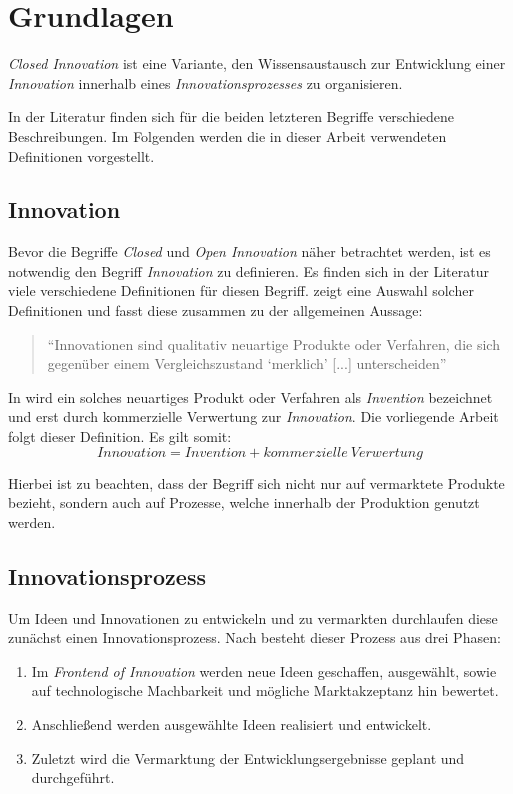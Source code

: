 \section{Grundlagen}\label{sec:grundlagen}
\textit{Closed Innovation} ist eine Variante, den Wissensaustausch
zur Entwicklung einer \textit{Innovation}
innerhalb eines \textit{Innovationsprozesses} zu organisieren.

In der Literatur finden sich für die beiden letzteren Begriffe verschiedene Beschreibungen.
Im Folgenden werden die in dieser Arbeit verwendeten Definitionen vorgestellt.

\subsection{Innovation}\label{sec:grundlagen-inno}
Bevor die Begriffe \textit{Closed} und \textit{Open Innovation} näher betrachtet werden,
ist es notwendig den Begriff \textit{Innovation} zu definieren.
Es finden sich in der Literatur viele verschiedene Definitionen für diesen Begriff.
\cite[5]{hauschildt2016innovationsmanagement} zeigt eine Auswahl solcher Definitionen und fasst diese
zusammen zu der allgemeinen Aussage:
\begin{quote}
    \enquote{Innovationen sind qualitativ neuartige Produkte oder Verfahren,
    die sich gegenüber einem Vergleichszustand \enquote{merklich} [...] unterscheiden}
    \cite[4]{hauschildt2016innovationsmanagement}
\end{quote}

In \cite[9]{herzog2011} wird ein solches neuartiges Produkt oder Verfahren als \textit{Invention} bezeichnet und erst durch kommerzielle Verwertung zur \textit{Innovation}.
Die vorliegende Arbeit folgt dieser Definition.
Es gilt somit:
\begin{equation*}
    Innovation = Invention + kommerzielle~Verwertung
\end{equation*}

Hierbei ist zu beachten, dass der Begriff sich nicht nur auf vermarktete Produkte bezieht,
sondern auch auf Prozesse, welche innerhalb der Produktion genutzt werden.

\subsection{Innovationsprozess}\label{sec:grundlagen-prozess}
Um Ideen und Innovationen zu entwickeln und zu vermarkten durchlaufen diese zunächst einen Innovationsprozess.
Nach \cite[10\psq]{herzog2011} besteht dieser Prozess aus drei Phasen:
\begin{enumerate}
    \item Im \textit{Frontend of Innovation} werden neue Ideen geschaffen, ausgewählt, sowie auf technologische Machbarkeit und mögliche Marktakzeptanz hin bewertet.
    \item Anschließend werden ausgewählte Ideen realisiert und entwickelt.
    \item Zuletzt wird die Vermarktung der Entwicklungsergebnisse geplant und durchgeführt.
\end{enumerate}
